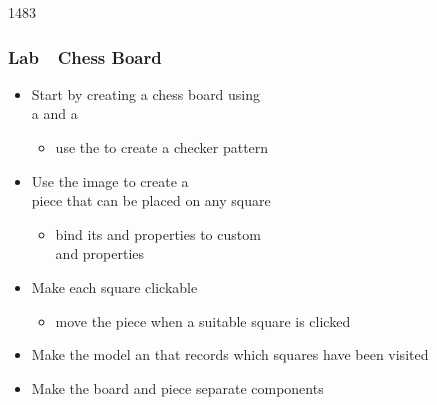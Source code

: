 
\begin{slide}{1483}\frametitle{Lab~\textendash~Chess Board}


\begin{itemize}
\item Start by creating a chess board using\\
      a  and a 
  \begin{itemize}
  \item use the  to create a checker pattern
  \end{itemize}
\item Use the  image to create a\\
      piece that can be placed on any square
  \begin{itemize}
  \item bind its  and  properties to custom\\
         and  properties
  \end{itemize}
\item Make each square clickable
  \begin{itemize}
  \item move the piece when a suitable square is clicked
  \end{itemize}
\item Make the model an  that records which squares have been
      visited
\item Make the board and piece separate components
\end{itemize}

\end{slide}


